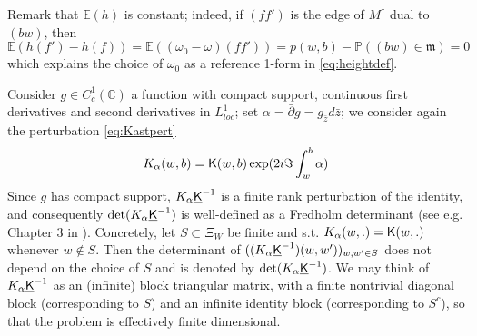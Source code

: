 \documentclass[10pt]{article}
\newcommand{\C}{\mathbb{C}}
\newcommand{\E}{\mathbb{E}}
\renewcommand{\P}{\mathbb{P}}
\newcommand{\rK}{{\sf K}}
\newcommand{\uK}{{\underline {\sf K}}}
\newcommand{\dg}{\dagger}
\newcommand{\mfm}{{\mathfrak m}}
\begin{document}
Remark that $\E(h)$ is constant; indeed, if $(ff')$ is the edge of $M^\dg$ dual to $(bw)$, then
$$\E(h(f')-h(f))=\E((\omega_0-\omega)(ff'))=p(w,b)-\P((bw)\in\mfm)=0$$
which explains the choice of $\omega_0$ as a reference 1-form in \eqref{eq:heightdef}.
%

Consider $g\in C^1_c(\C)$ a function with compact support, continuous first derivatives and second derivatives in $L^1_{loc}$; set $\alpha=\bar\partial g=g_{\bar z}d\bar z$; we consider again the perturbation \eqref{eq:Kastpert}
$$K_\alpha(w,b)=\rK(w,b)\exp(2i\Im\int_w^b\alpha)$$
Since $g$ has compact support, $K_\alpha\uK^{-1}$ is a finite rank perturbation of the identity, and consequently $\det(K_\alpha\uK^{-1})$ is well-defined as a Fredholm determinant (see e.g. Chapter 3 in \cite{SimTrace}). Concretely, let $S\subset\Xi_W$ be finite and s.t. $K_\alpha(w,.)=\rK(w,.)$ whenever $w\notin S$. Then the determinant of $((K_\alpha\uK^{-1})(w,w'))_{w,w'\in S}$ does not depend on the choice of $S$ and is denoted by $\det(K_\alpha\uK^{-1})$. We may think of $K_\alpha\uK^{-1}$ as an (infinite) block triangular matrix, with a finite nontrivial diagonal block (corresponding to $S$) and an infinite identity block (corresponding to $S^c$), so that the problem is effectively finite dimensional.
\end{document}

